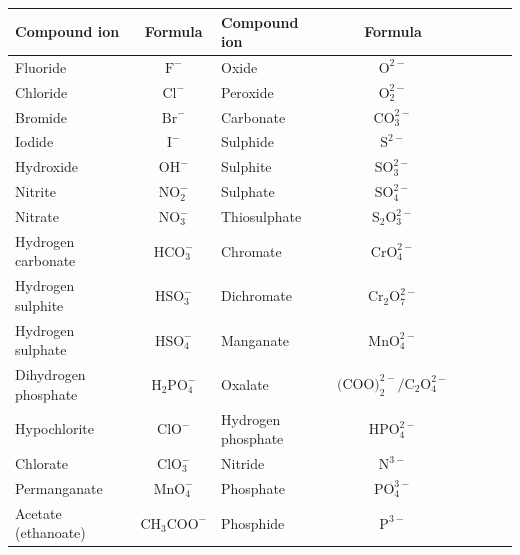 \begin{enumerate}[noitemsep, label=\textbf{\arabic*}. ]
\begin{table}[H]
\begin{center}
\label{tab:anions}
\begin{tabular}{|l|c|l|c|l|c|l|c|} \hline
\textbf{Compound ion} & \textbf{Formula}            & \textbf{Compound ion} & \textbf{Formula} \\ \hline
Fluoride             & $\text{F}^{-}$             & Oxide              & $\text{O}^{2-}$ \\ \hline
Chloride             & $\text{Cl}^{-}$            & Peroxide           & $\text{O}_{2}^{2-}$ \\ \hline
Bromide              & $\text{Br}^{-}$            & Carbonate          & $\text{CO}_{3}^{2-}$ \\ \hline
Iodide               & $\text{I}^{-}$             & Sulphide           & $\text{S}^{2-}$ \\ \hline
Hydroxide            & $\text{OH}^{-}$            & Sulphite           & $\text{SO}_{3}^{2-}$ \\ \hline
Nitrite              & $\text{NO}_{2}^{-}$        & Sulphate           & $\text{SO}_{4}^{2-}$ \\ \hline
Nitrate              & $\text{NO}_{3}^{-}$        & Thiosulphate       & $\text{S}_{2}{\text{O}}_{3}^{2-}$ \\ \hline
Hydrogen carbonate   & $\text{HCO}_{3}^{-}$       & Chromate           & $\text{CrO}_{4}^{2-}$ \\ \hline
Hydrogen sulphite    & $\text{HSO}_{3}^{-}$       & Dichromate         & $\text{Cr}_{2}{\text{O}}_{7}^{2-}$ \\ \hline
Hydrogen sulphate    & $\text{HSO}_{4}^{-}$       & Manganate          & $\text{MnO}_{4}^{2-}$ \\ \hline
Dihydrogen phosphate & $\text{H}_{2}{\text{PO}}_{4}^{-}$ & Oxalate     & $\text{(COO)}_{2}^{2-}/{\text{C}}_{2}{\text{O}}_{4}^{2-}$ \\ \hline
Hypochlorite         & $\text{ClO}^{-}$           & Hydrogen phosphate & $\text{HPO}_{4}^{2-}$ \\ \hline
Chlorate             & $\text{ClO}_{3}^{-}$       & Nitride            & $\text{N}^{3-}$ \\ \hline
Permanganate         & $\text{MnO}_{4}^{-}$       & Phosphate          & $\text{PO}_{4}^{3-}$ \\ \hline
Acetate (ethanoate)  & $\text{CH}_{3}{\text{COO}}^{-}$   & Phosphide   & $\text{P}^{3-}$ \\ \hline
\end{tabular}


\end{center}
\end{table}
\end{enumerate}
